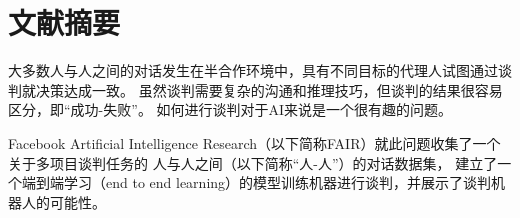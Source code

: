 \section*{文献摘要}
大多数人与人之间的对话发生在半合作环境中，具有不同目标的代理人试图通过谈判就决策达成一致。
虽然谈判需要复杂的沟通和推理技巧，但谈判的结果很容易区分，即``成功-失败''。
如何进行谈判对于AI来说是一个很有趣的问题。

Facebook Artificial Intelligence Research（以下简称FAIR）就此问题收集了一个关于多项目谈判任务的
人与人之间（以下简称``人-人''）的对话数据集，
建立了一个端到端学习（end to end learning）的模型训练机器进行谈判，并展示了谈判机器人的可能性。